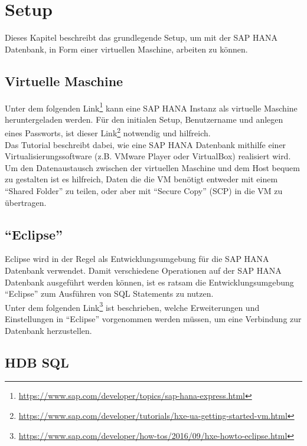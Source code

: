\chapter{Setup}
Dieses Kapitel beschreibt das grundlegende Setup, um mit der SAP HANA Datenbank, in Form einer virtuellen Maschine, arbeiten zu können.

\section{Virtuelle Maschine}
Unter dem folgenden Link\footnote{\url{https://www.sap.com/developer/topics/sap-hana-express.html}}  kann eine SAP HANA Instanz als virtuelle Maschine heruntergeladen werden. Für den initialen Setup, Benutzername und anlegen eines Passworts, ist dieser Link\footnote{\url{https://www.sap.com/developer/tutorials/hxe-ua-getting-started-vm.html}}  notwendig und hilfreich.\\
Das Tutorial beschreibt dabei, wie eine SAP HANA Datenbank mithilfe einer Virtualisierungssoftware (z.B. VMware Player oder VirtualBox) realisiert wird. Um den Datenaustausch zwischen der virtuellen Maschine und dem Host bequem zu gestalten ist es hilfreich, Daten die die VM benötigt entweder mit einem \enquote{Shared Folder} zu teilen, oder aber mit \enquote{Secure Copy} (SCP) in die VM zu übertragen.


\section{\enquote{Eclipse}}
Eclipse wird in der Regel als Entwicklungsumgebung für die SAP HANA Datenbank verwendet.
Damit verschiedene Operationen auf der SAP HANA Datenbank ausgeführt werden können, ist es ratsam die Entwicklungsumgebung \enquote{Eclipse} zum Ausführen von SQL Statements zu nutzen. \\Unter dem folgenden Link\footnote{\url{https://www.sap.com/developer/how-tos/2016/09/hxe-howto-eclipse.html}} ist beschrieben, welche Erweiterungen und Einstellungen in \enquote{Eclipse} vorgenommen werden müssen, um eine Verbindung zur Datenbank herzustellen.

\section{HDB SQL}



